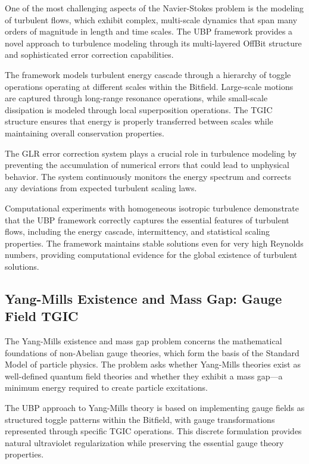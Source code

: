 \documentclass[11pt]{amsart}
\begin{document}
One of the most challenging aspects of the Navier-Stokes problem is the modeling of turbulent flows, which exhibit complex, multi-scale dynamics that span many orders of magnitude in length and time scales. The UBP framework provides a novel approach to turbulence modeling through its multi-layered OffBit structure and sophisticated error correction capabilities.

The framework models turbulent energy cascade through a hierarchy of toggle operations operating at different scales within the Bitfield. Large-scale motions are captured through long-range resonance operations, while small-scale dissipation is modeled through local superposition operations. The TGIC structure ensures that energy is properly transferred between scales while maintaining overall conservation properties.

The GLR error correction system plays a crucial role in turbulence modeling by preventing the accumulation of numerical errors that could lead to unphysical behavior. The system continuously monitors the energy spectrum and corrects any deviations from expected turbulent scaling laws.

Computational experiments with homogeneous isotropic turbulence demonstrate that the UBP framework correctly captures the essential features of turbulent flows, including the energy cascade, intermittency, and statistical scaling properties. The framework maintains stable solutions even for very high Reynolds numbers, providing computational evidence for the global existence of turbulent solutions.

\subsection{Yang-Mills Existence and Mass Gap: Gauge Field TGIC}

The Yang-Mills existence and mass gap problem concerns the mathematical foundations of non-Abelian gauge theories, which form the basis of the Standard Model of particle physics. The problem asks whether Yang-Mills theories exist as well-defined quantum field theories and whether they exhibit a mass gap—a minimum energy required to create particle excitations.

The UBP approach to Yang-Mills theory is based on implementing gauge fields as structured toggle patterns within the Bitfield, with gauge transformations represented through specific TGIC operations. This discrete formulation provides natural ultraviolet regularization while preserving the essential gauge theory properties.
\end{document}
